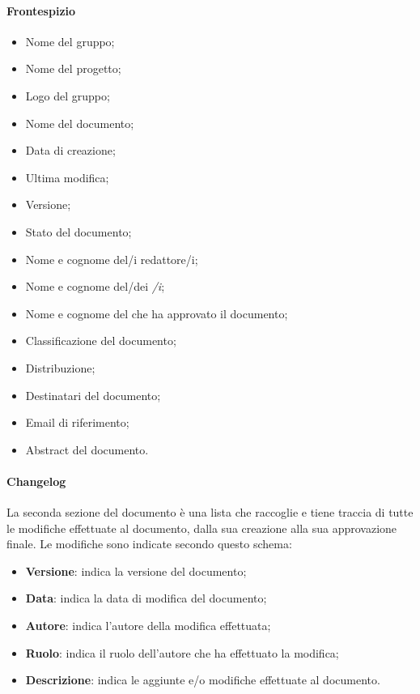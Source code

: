 			\paragraph{Frontespizio}
			\begin{itemize}
				\item{Nome del gruppo;}
				\item{Nome del progetto;}
				\item{Logo del gruppo;}
				\item{Nome del documento;}
				\item{Data di creazione;}
				\item{Ultima modifica;}
				\item{Versione;}
				\item{Stato del documento;}
				\item{Nome e cognome del/i redattore/i;}
				\item{Nome e cognome del/dei \textit{\Ver/i};}
				\item{Nome e cognome del \textit{\RdP} che ha approvato il documento;}
				\item{Classificazione del documento;}
				\item{Distribuzione;}
				\item{Destinatari del documento;}
				\item{Email di riferimento;}
				\item{Abstract del documento.}
			\end{itemize}
	
			\paragraph{Changelog}
			La seconda sezione del documento è una lista che raccoglie e tiene traccia di tutte le modifiche effettuate al documento, dalla sua creazione alla sua approvazione finale. Le modifiche sono indicate secondo questo schema:
			\begin{itemize}
				\item \textbf{Versione}: indica la versione del documento;
				\item \textbf{Data}: indica la data di modifica del documento;
				\item\textbf{Autore}: indica l'autore della modifica effettuata;
				\item \textbf{Ruolo}: indica il ruolo dell'autore che ha effettuato la modifica;
				\item\textbf{Descrizione}: indica le aggiunte e/o modifiche effettuate al documento.
			\end{itemize}	

